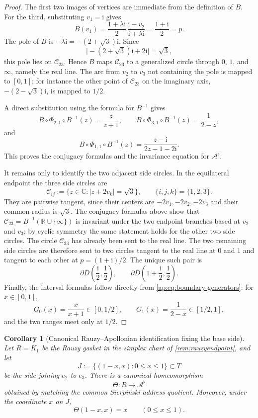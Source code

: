 \documentclass[11pt]{amsart}
\newtheorem{corollary}[corollary]{Corollary}
\theoremstyle{definition}
\newcommand{\R}{\mathbb{R}}
\newcommand{\C}{\mathbb{C}}
\newcommand{\ii}{\mathrm{i}}
\begin{document}
\begin{proof}
The first two images of vertices are immediate from the definition of $B$.  For the third, substituting $v_1=\ii$ gives
\[
  B(v_1)=\frac{1+\lambda\ii}{2}\,
        \frac{\ii-v_2}{\ii+\lambda\ii}
       =\frac{1+\ii}{2}=p.
\]
The pole of $B$ is $-\lambda\ii=-(2+\sqrt3)\ii$.  Since
\[
  \bigl|-(2+\sqrt3)\ii+2\ii\bigr|=\sqrt3,
\]
this pole lies on $\mathcal C_{23}$.  Hence $B$ maps $\mathcal C_{23}$ to a generalized circle through $0$, $1$, and $\infty$, namely the real line.  The arc from $v_2$ to $v_3$ not containing the pole is mapped to $[0,1]$; for instance the other point of $\mathcal C_{23}$ on the imaginary axis, $-(2-\sqrt3)\ii$, is mapped to $1/2$.

A direct substitution using the formula for $B^{-1}$ gives
\[
  B\circ\Phi_{2,1}\circ B^{-1}(z)=\frac{z}{z+1},
  \qquad
  B\circ\Phi_{3,1}\circ B^{-1}(z)=\frac{1}{2-z},
\]
and
\[
  B\circ\Phi_{1,1}\circ B^{-1}(z)=\frac{z-\ii}{2z-1-2\ii}.
\]
This proves the conjugacy formulas and the invariance equation for $\mathcal A^{\flat}$.

It remains only to identify the two adjacent side circles.  In the equilateral endpoint the three side circles are
\[
  \mathcal C_{ij}:=\{z\in\C: |z+2v_k|=\sqrt3\},
  \qquad \{i,j,k\}=\{1,2,3\}.
\]
They are pairwise tangent, since their centers are $-2v_1,-2v_2,-2v_3$ and their common radius is $\sqrt3$.  The conjugacy formulas above show that $\mathcal C_{23}=B^{-1}(\R\cup\{\infty\})$ is invariant under the two endpoint branches based at $v_2$ and $v_3$; by cyclic symmetry the same statement holds for the other two side circles.  The circle $\mathcal C_{23}$ has already been sent to the real line.  The two remaining side circles are therefore sent to two circles tangent to the real line at $0$ and $1$ and tangent to each other at $p=(1+\ii)/2$.  The unique such pair is
\[
  \partial\overline{D}\!\left(\frac{\ii}{2},\frac12\right),
  \qquad
  \partial\overline{D}\!\left(1+\frac{\ii}{2},\frac12\right).
\]
Finally, the interval formulas follow directly from \eqref{ap:eq:boundary-generators}: for $x\in[0,1]$,
\[
  G_0(x)=\frac{x}{x+1}\in[0,1/2],
  \qquad
  G_1(x)=\frac{1}{2-x}\in[1/2,1],
\]
and the two ranges meet only at $1/2$.
\end{proof}

\begin{corollary}[Canonical Rauzy--Apollonian identification fixing the base side]\label{ap:cor:rauzy-apollonian-homeo}
Let $R=K_1$ be the Rauzy gasket in the simplex chart of \cref{rem:rauzyendpoint}, and let
\[
  J:=\{(1-x,x):0\le x\le1\}\subset T
\]
be the side joining $e_2$ to $e_3$.  There is a canonical homeomorphism
\[
  \Theta:R\longrightarrow \mathcal A^{\flat}
\]
obtained by matching the common Sierpi\'nski address quotient.  Moreover, under the coordinate $x$ on $J$,
\[
  \Theta(1-x,x)=x\qquad(0\le x\le1).
\]
\end{corollary}
\end{document}
